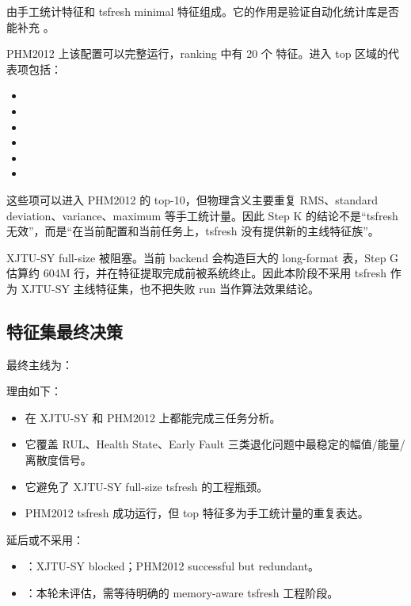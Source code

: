  由手工统计特征和 tsfresh minimal 特征组成。它的作用是验证自动化统计库是否能补充 。

PHM2012 上该配置可以完整运行，ranking 中有 20 个  特征。进入 top 区域的代表项包括：

\begin{itemize}[leftmargin=2em]
  \item {}
  \item {}
  \item {}
  \item {}
  \item {}
  \item {}
\end{itemize}

这些项可以进入 PHM2012 的 top-10，但物理含义主要重复 RMS、standard deviation、variance、maximum 等手工统计量。因此 Step K 的结论不是“tsfresh 无效”，而是“在当前配置和当前任务上，tsfresh 没有提供新的主线特征族”。

XJTU-SY full-size  被阻塞。当前 backend 会构造巨大的 long-format 表，Step G 估算约 604M 行，并在特征提取完成前被系统终止。因此本阶段不采用 tsfresh 作为 XJTU-SY 主线特征集，也不把失败 run 当作算法效果结论。

\subsection{特征集最终决策}

最终主线为：

\begin{center}
\end{center}

理由如下：

\begin{itemize}[leftmargin=2em]
  \item {} 在 XJTU-SY 和 PHM2012 上都能完成三任务分析。
  \item 它覆盖 RUL、Health State、Early Fault 三类退化问题中最稳定的幅值/能量/离散度信号。
  \item 它避免了 XJTU-SY full-size tsfresh 的工程瓶颈。
  \item PHM2012 tsfresh 成功运行，但 top 特征多为手工统计量的重复表达。
\end{itemize}

延后或不采用：

\begin{itemize}[leftmargin=2em]
  \item {}：XJTU-SY blocked；PHM2012 successful but redundant。
  \item {}：本轮未评估，需等待明确的 memory-aware tsfresh 工程阶段。
\end{itemize}
